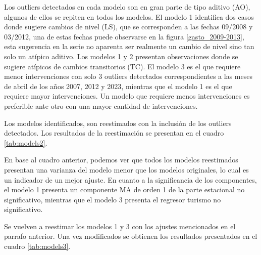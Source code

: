 \documentclass[
  12pt,
]{article}
\begin{document}
Los outliers detectados en cada modelo son en gran parte de tipo aditivo
(AO), algunos de ellos se repiten en todos los modelos. El modelo 1
identifica dos casos donde sugiere cambios de nivel (LS), que se
corresponden a las fechas 09/2008 y 03/2012, una de estas fechas puede
observarse en la figura \ref{gasto_2009-2013}, esta sugerencia en la
serie no aparenta ser realmente un cambio de nivel sino tan solo un
atípico aditivo. Los modelos 1 y 2 presentan observaciones donde se
sugiere atípicos de cambios transitorios (TC). El modelo 3 es el que
requiere menor intervenciones con solo 3 outliers detectados
correspondientes a las meses de abril de los años 2007, 2012 y 2023,
mientras que el modelo 1 es el que requiere mayor intervenciones. Un
modelo que requiere menos intervenciones es preferible ante otro con una
mayor cantidad de intervenciones.

Los modelos identificados, son reestimados con la inclusión de los
outliers detectados. Los resultados de la reestimación se presentan en
el cuadro \ref{tab:models2}.

\begin{table}[H]
\centering
{}
\caption{Reestimación de modelos SARIMA con intervención de outliers.}
\label{tab:models2}
\end{table}

En base al cuadro anterior, podemos ver que todos los modelos
reestimados presentan una varianza del modelo menor que los modelos
originales, lo cual es un indicador de un mejor ajuste. En cuanto a la
significancia de los componentes, el modelo 1 presenta un componente MA
de orden 1 de la parte estacional no significativo, mientras que el
modelo 3 presenta el regresor turismo no significativo.

Se vuelven a reestimar los modelos 1 y 3 con los ajustes mencionados en
el parrafo anterior. Una vez modificados se obtienen los resultados
presentados en el cuadro \ref{tab:models3}.
\end{document}
